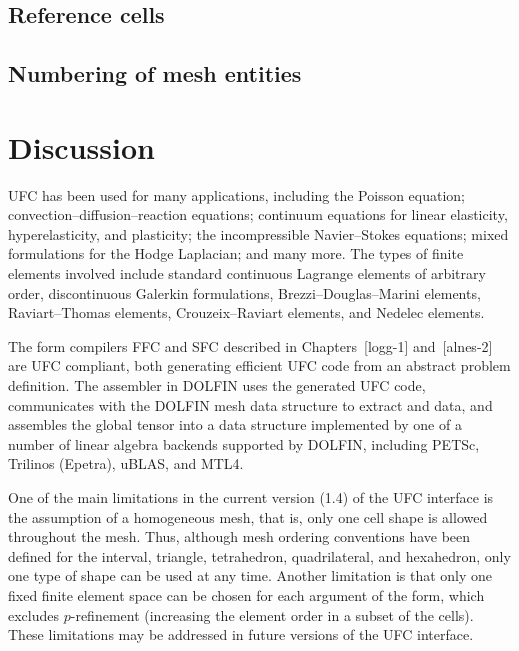 \subsection{Reference cells}



\subsection{Numbering of mesh entities}



\section{Discussion}

UFC has been used for many applications, including the Poisson
equation; convection--diffusion--reaction equations; continuum
equations for linear elasticity, hyperelasticity, and plasticity; the
incompressible Navier--Stokes equations; mixed formulations for the
Hodge Laplacian; and many more. The types of finite elements involved
include standard continuous Lagrange elements of arbitrary order,
discontinuous Galerkin formulations, Brezzi--Douglas--Marini elements,
Raviart--Thomas elements, Crouzeix--Raviart elements, and Nedelec
elements.

The form compilers FFC and SFC described in Chapters~[logg-1]
and~[alnes-2] are UFC compliant, both generating efficient UFC code
from an abstract problem definition. The assembler in DOLFIN uses the
generated UFC code, communicates with the DOLFIN mesh data structure
to extract  and  data, and assembles the
global tensor into a data structure implemented by one of a number of
linear algebra backends supported by DOLFIN, including PETSc, Trilinos
(Epetra), uBLAS, and MTL4.

One of the main limitations in the current version (1.4) of the UFC
interface is the assumption of a homogeneous mesh, that is, only one
cell shape is allowed throughout the mesh. Thus, although mesh
ordering conventions have been defined for the interval, triangle,
tetrahedron, quadrilateral, and hexahedron, only one type of shape can
be used at any time. Another limitation is that only one fixed finite
element space can be chosen for each argument of the form, which
excludes $p$-refinement (increasing the element order in a subset of
the cells). These limitations may be addressed in future versions of
the UFC interface.

